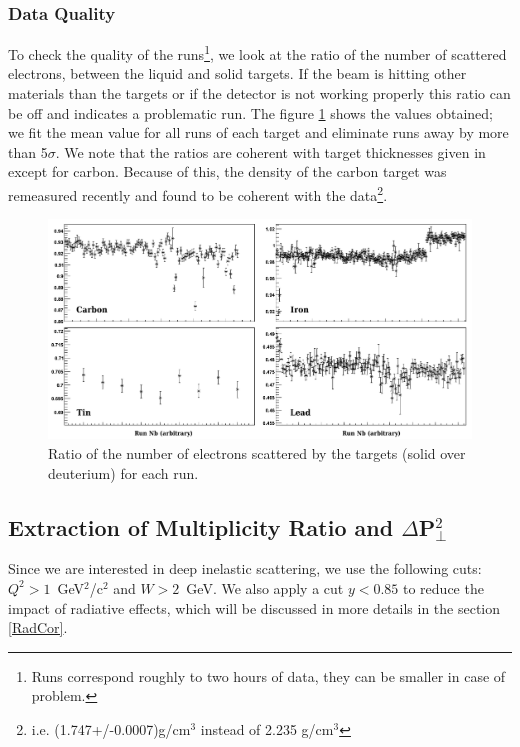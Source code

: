 \subsubsection{Data Quality}

To check the quality of the runs\footnote{Runs correspond roughly to two hours
of data, they can be smaller in case of problem.}, we look at the ratio of the number of 
scattered electrons, between the liquid and solid targets. If the beam is 
hitting other materials than the targets or if the detector is not working 
properly this ratio can be off and indicates a problematic run. The figure 
\ref{DataQ} shows the values obtained; we fit the 
mean value for all runs of each target and eliminate runs away by more than 
5$\sigma$. We note that the ratios are coherent with target thicknesses given 
in \cite{Hakobyan:2008zz} except for carbon. Because of this, the density of 
the carbon target was remeasured recently and found to be coherent with the 
data\footnote{i.e. (1.747+/-0.0007)g/cm$^3$ instead of 2.235 g/cm$^3$}.

\begin{figure}[tbp]
\centering
\includegraphics[width=15cm] {chap5-fig/TargetElRatio.png}
\caption {Ratio of the number of electrons scattered by the targets (solid over deuterium) 
for each run.}
\label{DataQ}
\end{figure}

\subsection{Extraction of Multiplicity Ratio and $\Delta$P$_\perp^2$}
\label{sec:obs}

Since we are interested in deep inelastic scattering, we use the following 
cuts: $Q^2 > 1$~GeV$^2$/c$^2$ and $W > 2$~GeV. We also apply a cut $y < 0.85$ to 
reduce the impact of radiative effects, which will be discussed in more details in 
the section \ref{RadCor}.


